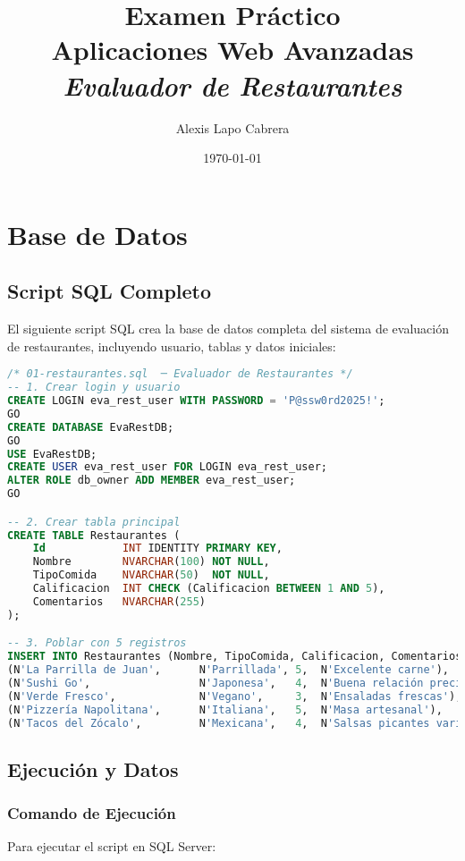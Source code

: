 \documentclass[12pt,a4paper]{report}
\title{
    \vspace{-2cm}
    \Huge\textbf{Examen Práctico} \\
    \LARGE\textbf{Aplicaciones Web Avanzadas} \\
    \vspace{0.5cm}
    \Large\textit{Evaluador de Restaurantes}
}
\author{\Large Alexis Lapo Cabrera}
\date{\Large\today}
\begin{document}
\maketitle
\newpage

\tableofcontents
\newpage

\chapter{Base de Datos}

\section{Script SQL Completo}

El siguiente script SQL crea la base de datos completa del sistema de evaluación de restaurantes, incluyendo usuario, tablas y datos iniciales:

\begin{lstlisting}[language=SQL]
/* 01-restaurantes.sql  ─ Evaluador de Restaurantes */
-- 1. Crear login y usuario
CREATE LOGIN eva_rest_user WITH PASSWORD = 'P@ssw0rd2025!';
GO
CREATE DATABASE EvaRestDB;
GO
USE EvaRestDB;
CREATE USER eva_rest_user FOR LOGIN eva_rest_user;
ALTER ROLE db_owner ADD MEMBER eva_rest_user;
GO

-- 2. Crear tabla principal
CREATE TABLE Restaurantes (
    Id            INT IDENTITY PRIMARY KEY,
    Nombre        NVARCHAR(100) NOT NULL,
    TipoComida    NVARCHAR(50)  NOT NULL,
    Calificacion  INT CHECK (Calificacion BETWEEN 1 AND 5),
    Comentarios   NVARCHAR(255)
);

-- 3. Poblar con 5 registros
INSERT INTO Restaurantes (Nombre, TipoComida, Calificacion, Comentarios) VALUES
(N'La Parrilla de Juan',      N'Parrillada', 5,  N'Excelente carne'),
(N'Sushi Go',                 N'Japonesa',   4,  N'Buena relación precio-calidad'),
(N'Verde Fresco',             N'Vegano',     3,  N'Ensaladas frescas'),
(N'Pizzería Napolitana',      N'Italiana',   5,  N'Masa artesanal'),
(N'Tacos del Zócalo',         N'Mexicana',   4,  N'Salsas picantes variadas');
\end{lstlisting}

\section{Ejecución y Datos}

\subsection{Comando de Ejecución}
Para ejecutar el script en SQL Server:
\end{document}
